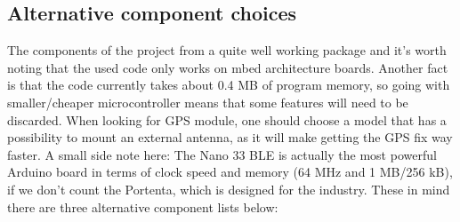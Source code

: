 \documentclass[a4paper,11pt]{article}
\begin{document}
\subsection{Alternative component choices}
\label{sec:alt_comps}

The components of the project from a quite well working package and it's worth noting that the used code only works on mbed architecture boards. Another fact is that the code currently takes about 0.4 MB of program memory, so going with smaller/cheaper microcontroller means that some features will need to be discarded. When looking for GPS module, one should choose a model that has a possibility to mount an external antenna, as it will make getting the GPS fix way faster. A small side note here: The Nano 33 BLE is actually the most powerful Arduino board in terms of clock speed and memory (64 MHz and 1 MB/256 kB), if we don't count the Portenta, which is designed for the industry. These in mind there are three alternative component lists below:
\end{document}
